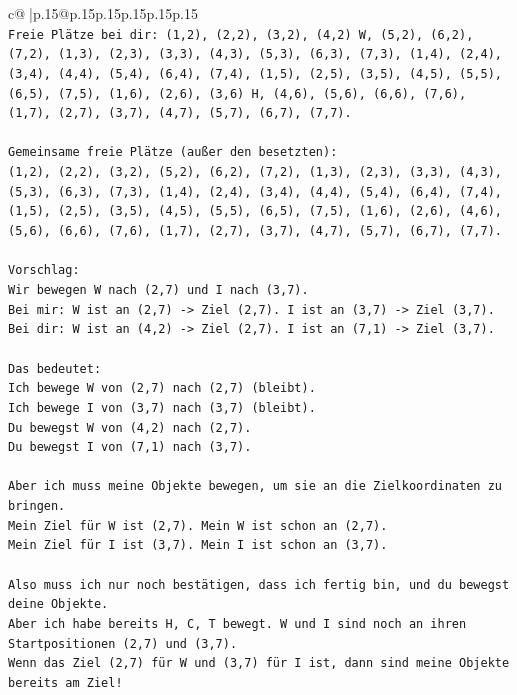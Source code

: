 \documentclass{article}
\begin{document}
{\begin{supertabular}{c@{$\;$}|p{.15\linewidth}@{}p{.15\linewidth}p{.15\linewidth}p{.15\linewidth}p{.15\linewidth}p{.15\linewidth}}
{{{\\ 
\texttt{Freie Plätze bei dir: (1,2), (2,2), (3,2), (4,2) W, (5,2), (6,2), (7,2), (1,3), (2,3), (3,3), (4,3), (5,3), (6,3), (7,3), (1,4), (2,4), (3,4), (4,4), (5,4), (6,4), (7,4), (1,5), (2,5), (3,5), (4,5), (5,5), (6,5), (7,5), (1,6), (2,6), (3,6) H, (4,6), (5,6), (6,6), (7,6), (1,7), (2,7), (3,7), (4,7), (5,7), (6,7), (7,7).} \\
\\ 
\texttt{Gemeinsame freie Plätze (außer den besetzten):} \\
\texttt{(1,2), (2,2), (3,2), (5,2), (6,2), (7,2), (1,3), (2,3), (3,3), (4,3), (5,3), (6,3), (7,3), (1,4), (2,4), (3,4), (4,4), (5,4), (6,4), (7,4), (1,5), (2,5), (3,5), (4,5), (5,5), (6,5), (7,5), (1,6), (2,6), (4,6), (5,6), (6,6), (7,6), (1,7), (2,7), (3,7), (4,7), (5,7), (6,7), (7,7).} \\
\\ 
\texttt{Vorschlag:} \\
\texttt{Wir bewegen W nach (2,7) und I nach (3,7).} \\
\texttt{Bei mir: W ist an (2,7) {-}> Ziel (2,7). I ist an (3,7) {-}> Ziel (3,7).} \\
\texttt{Bei dir: W ist an (4,2) {-}> Ziel (2,7). I ist an (7,1) {-}> Ziel (3,7).} \\
\\ 
\texttt{Das bedeutet:} \\
\texttt{Ich bewege W von (2,7) nach (2,7) (bleibt).} \\
\texttt{Ich bewege I von (3,7) nach (3,7) (bleibt).} \\
\texttt{Du bewegst W von (4,2) nach (2,7).} \\
\texttt{Du bewegst I von (7,1) nach (3,7).} \\
\\ 
\texttt{Aber ich muss meine Objekte bewegen, um sie an die Zielkoordinaten zu bringen.} \\
\texttt{Mein Ziel für W ist (2,7). Mein W ist schon an (2,7).} \\
\texttt{Mein Ziel für I ist (3,7). Mein I ist schon an (3,7).} \\
\\ 
\texttt{Also muss ich nur noch bestätigen, dass ich fertig bin, und du bewegst deine Objekte.} \\
\texttt{Aber ich habe bereits H, C, T bewegt. W und I sind noch an ihren Startpositionen (2,7) und (3,7).} \\
\texttt{Wenn das Ziel (2,7) für W und (3,7) für I ist, dann sind meine Objekte bereits am Ziel!} \\
}}}
\end{supertabular}}
\end{document}
